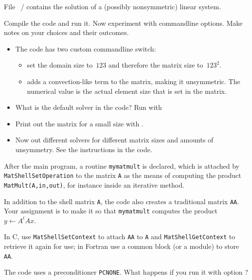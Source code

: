 \begin{exerciseframe}[ksp]
  File ~/  contains the solution of a (possibly
  nonsymmetric) linear system.

  Compile the code and run it. Now experiment with commandline
  options. Make notes on your choices and their outcomes.
  \begin{itemize}
  \item The code has two custom commandline switch:
    \begin{itemize}
    \item {} set the domain size to~$123$ and therefore the
      matrix size to~$123^2$.
    \item {} adds a convection-like term to the
      matrix, making it unsymmetric. The numerical value is the actual
      element size that is set in the matrix.
    \end{itemize}
  \item What is the default solver in the code? Run with 
  \item Print out the matrix for a small size with .
  \item Now out different solvers for different matrix sizes and
    amounts of unsymmetry. See the instructions in the code.
  \end{itemize}
\end{exerciseframe}

\begin{exerciseframe}[shell]
  After the main program, a routine \lstinline{mymatmult} is
  declared, which is attached by \lstinline{MatShellSetOperation} to the matrix
  \lstinline{A} as the means of computing the product \lstinline{MatMult(A,in,out)}, for
  instance inside an iterative method.

  In addition to the shell matrix \lstinline{A}, the code also creates a
  traditional matrix \lstinline{AA}. Your assignment is to make it so that
  \lstinline{mymatmult} computes the product $y\leftarrow A^tAx$.

  In C, use \lstinline{MatShellSetContext} to attach \lstinline{AA} to \lstinline{A} and
  \lstinline{MatShellGetContext} to retrieve it again for use; in Fortran use a
  common block (or a module) to store \lstinline{AA}.

  The code uses a preconditioner \lstinline{PCNONE}. What happens if you run it
  with option ?
\end{exerciseframe}


